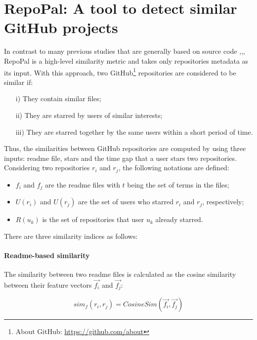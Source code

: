 \section{RepoPal: A tool to detect similar GitHub projects}

In contrast to many previous studies that are generally based on source code \cite{10.1109/APSEC.2004.69},\cite{Liu:2006:GDS:1150402.1150522},\cite{McMillan:2012:DSS:2337223.2337267}, RepoPal  \cite{10.1109/SANER.2017.7884605} is a high-level similarity metric and takes only repositories metadata as its input. With this approach, two GitHub\footnote{About GitHub: \url{https://github.com/about}} repositories are considered to be similar if:

\begin{itemize}
	\item[i)] They contain similar  files;
	\item[ii)] They are starred by users of similar interests;
	\item[iii)] They are starred together by the same users within a short period of time. 
\end{itemize}

Thus, the similarities between GitHub repositories are computed by using three inputs: readme file, stars and the time gap that a user stars two repositories. Considering two repositories $ r_{i} $ and $ r_{j} $, the following notations are defined: 

\begin{itemize}
	\item $ f_{i} $ and $ f_{j} $ are the readme files with $ t $ being the set of terms in the files; 
	\item $ U(r_{i}) $ and $ U(r_{j}) $ are the set of users who starred $ r_{i} $ and $ r_{j} $, respectively; 
	\item $ R(u_{k}) $ is the set of repositories that user $ u_{k} $ already starred.  
\end{itemize}

There are three similarity indices as follows:

\paragraph{Readme-based similarity} 

The similarity between two readme files is calculated as the cosine similarity between their feature vectors $\vec{f_{i}}$ and $\vec{f_{j}}$: 

\begin{equation}
sim_{f}(r_{i},r_{j})=CosineSim(\vec{f_{i}},\vec{f_{j}})
\end{equation}

